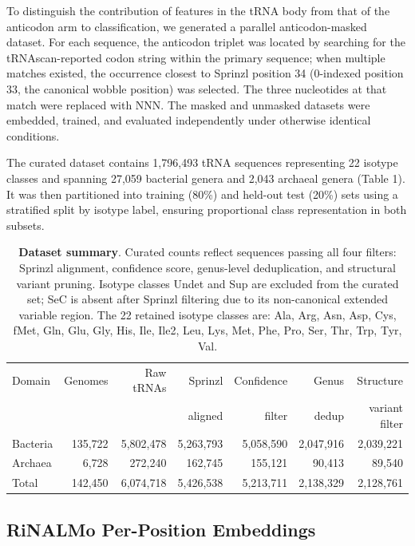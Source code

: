 \documentclass{article}
\begin{document}
To distinguish the contribution of features in the tRNA body from that of the anticodon arm to classification, we generated a parallel anticodon-masked dataset. For each sequence, the anticodon triplet was located by searching for the tRNAscan-reported codon string within the primary sequence; when multiple matches existed, the occurrence closest to Sprinzl position 34 (0-indexed position 33, the canonical wobble position) was selected. The three nucleotides at that match were replaced with NNN. The masked and unmasked datasets were embedded, trained, and evaluated independently under otherwise identical conditions.

The curated dataset contains 1,796,493 tRNA sequences representing 22 isotype classes and spanning 27,059 bacterial genera and 2,043 archaeal genera (Table 1). It was then partitioned into training (80\%) and held-out test (20\%) sets using a stratified split by isotype label, ensuring proportional class representation in both subsets.


\begin{table}[t]
\centering
\small
\begin{tabular}{lrrrrrr}
\toprule
Domain & Genomes & Raw tRNAs & Sprinzl & Confidence & Genus & Structure \\
       &         &           & aligned & filter     & dedup & variant filter \\
\midrule
Bacteria & 135{,}722 & 5{,}802{,}478 & 5{,}263{,}793 & 5{,}058{,}590 & 2{,}047{,}916 & 2{,}039{,}221 \\
Archaea  & 6{,}728   & 272{,}240     & 162{,}745     & 155{,}121     & 90{,}413     & 89{,}540 \\
\midrule
Total    & 142{,}450 & 6{,}074{,}718 & 5{,}426{,}538 & 5{,}213{,}711 & 2{,}138{,}329 & 2{,}128{,}761 \\
\bottomrule
\end{tabular}
\caption{\textbf{Dataset summary}. Curated counts reflect sequences passing all four filters: Sprinzl alignment, confidence score, genus-level deduplication, and structural variant pruning. Isotype classes Undet and Sup are excluded from the curated set; SeC is absent after Sprinzl filtering due to its non-canonical extended variable region. The 22 retained isotype classes are: Ala, Arg, Asn, Asp, Cys, fMet, Gln, Glu, Gly, His, Ile, Ile2, Leu, Lys, Met, Phe, Pro, Ser, Thr, Trp, Tyr, Val.}
\label{tab:trna_summary}
\end{table}

\subsection{RiNALMo Per-Position Embeddings}
\end{document}
